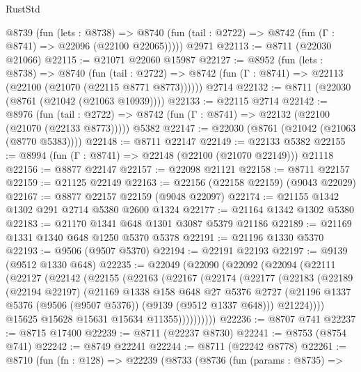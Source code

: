 \begin{lexlean}{RustStd}
\begin{coremodule}
    @8739
      (fun (lets : @8738) =>
      @8740 (fun (tail : @2722) => @8742 (fun (Γ : @8741) => @22096 (@22100 @22065)))))
    @2971
@22113 := @8711 (@22030 @21066)
@22115 := @21071 @22060 @15987
@22127 := @8952
    (fun (lets : @8738) =>
    @8740
      (fun (tail : @2722) =>
      @8742 (fun (Γ : @8741) => @22113 (@22100 (@21070 (@22115 @8771 @8773))))))
    @2714
@22132 := @8711 (@22030 (@8761 (@21042 (@21063 @10939))))
@22133 := @22115 @2714
@22142 := @8976
    (fun (tail : @2722) => @8742 (fun (Γ : @8741) => @22132 (@22100 (@21070 (@22133 @8773)))))
    @5382
@22147 := @22030 (@8761 (@21042 (@21063 (@8770 @5383))))
@22148 := @8711 @22147
@22149 := @22133 @5382
@22155 := @8994 (fun (Γ : @8741) => @22148 (@22100 (@21070 @22149))) @21118
@22156 := @8877 @22147
@22157 := @22098 @21121
@22158 := @8711 @22157
@22159 := @21125 @22149
@22163 := @22156 (@22158 @22159) (@9043 @22029)
@22167 := @8877 @22157 @22159 (@9048 @22097)
@22174 := @21155 @1342 @1302 @291 @2714 @5380 @2600 @1324
@22177 := @21164 @1342 @1302 @5380
@22183 := @21170 @1341 @648 @1301 @3087 @5379 @21186
@22189 := @21169 @1331 @1340 @648 @1250 @5370 @5378
@22191 := @21196 @1330 @5370
@22193 := @9506 (@9507 @5370)
@22194 := @22191 @22193
@22197 := @9139 (@9512 @1330 @648)
@22235 := @22049
    (@22090
      (@22092
        (@22094
          (@22111
            (@22127
              (@22142
                (@22155
                  (@22163
                    (@22167
                      (@22174
                        (@22177
                          (@22183
                            (@22189
                              (@22194 @22197)
                              (@21169
                                @1338
                                @158
                                @648
                                @27
                                @5376
                                @2727
                                (@21196
                                  @1337
                                  @5376
                                  (@9506 (@9507 @5376))
                                  (@9139 (@9512 @1337 @648)))
                                @21224))))
                        @15625
                        @15628
                        @15631
                        @15634
                        @11355))))))))))
@22236 := @8707 @741
@22237 := @8715 @17400
@22239 := @8711 (@22237 @8730)
@22241 := @8753 (@8754 @741)
@22242 := @8749 @22241
@22244 := @8711 (@22242 @8778)
@22261 := @8710
    (fun (fn : @128) =>
    @22239
      (@8733
        (@8736
          (fun (params : @8735) =>

\end{coremodule}
\end{lexlean}
